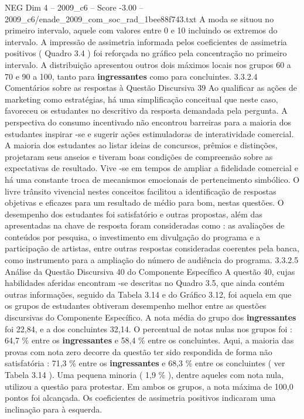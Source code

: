 \begin{textsample}{NEG Dim 4 – 2009\_c6 – Score -3.00 – 2009\_c6/enade\_2009\_com\_soc\_rad\_1bee88f743.txt}
A moda se situou no primeiro intervalo, aquele com valores entre 0 e 10 incluindo os extremos do intervalo.
A impressão de assimetria informada pelos coeficientes de assimetria positivos ( Quadro 3.4 ) foi reforçada no gráfico pela concentração no primeiro intervalo.
A distribuição apresentou outros dois máximos locais nos grupos 60 a 70 e 90 a 100, tanto para \textbf{ingressantes} como para concluintes. 3.3.2.4 Comentários sobre as respostas à Questão Discursiva 39 Ao qualificar as ações de marketing como estratégias, há uma simplificação conceitual que neste caso, favoreceu os estudantes no descritivo da resposta demandada pela pergunta.
A perspectiva do consumo incentivado não encontrou barreiras para a maioria dos estudantes inspirar -se e sugerir ações estimuladoras de interatividade comercial.
A maioria dos estudantes ao listar ideias de concursos, prêmios e distinções, projetaram seus anseios e tiveram boas condições de compreensão sobre as expectativas de resultado.
Vive -se em tempos de ampliar a fidelidade comercial e há uma constante troca de mecanismos emocionais de pertencimento simbólico.
O livre trânsito vivencial nestes conceitos facilitou a identificação de respostas objetivas e eficazes para um resultado de médio para bom, nestas questões.
O desempenho dos estudantes foi satisfatório e outras propostas, além das apresentadas na chave de resposta foram consideradas como : as avaliações de conteúdos por pesquisa, o investimento em divulgação do programa e a participação de artistas, entre outras respostas consideradas coerentes pela banca, como instrumento para a ampliação do número de audiência do programa. 3.3.2.5 Análise da Questão Discursiva 40 do Componente Específico A questão 40, cujas habilidades aferidas encontram -se descritas no Quadro 3.5, que ainda contém outras informações, seguido da Tabela 3.14 e do Gráfico 3.12, foi aquela em que os grupos de estudantes obtiveram desempenho melhor entre as questões discursivas do Componente Específico.
A nota média do grupo dos \textbf{ingressantes} foi 22,84, e a dos concluintes 32,14.
O percentual de notas nulas nos grupos foi : 64,7 \% entre os \textbf{ingressantes} e 58,4 \% entre os concluintes.
Aqui, a maioria das provas com nota zero decorre da questão ter sido respondida de forma não satisfatória : 71,3 \% entre os \textbf{ingressantes} e 68,3 \% entre os concluintes ( ver Tabela 3.14 ).
Uma pequena minoria ( 1,9 \% ), dentre aqueles com nota nula, utilizou a questão para protestar.
Em ambos os grupos, a nota máxima de 100,0 pontos foi alcançada.
Os coeficientes de assimetria positivos indicaram uma inclinação para à esquerda.

\end{textsample}
